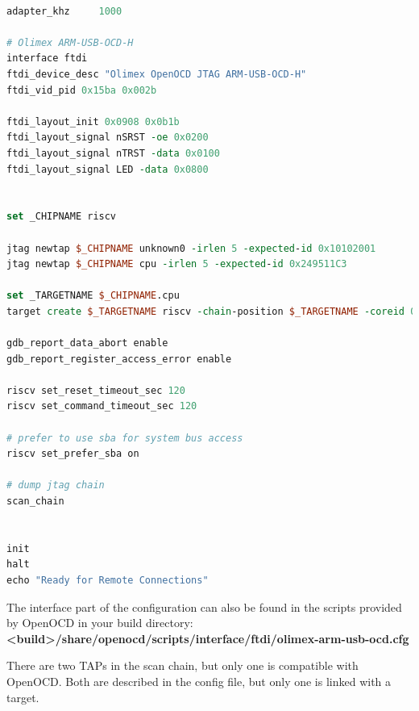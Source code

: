 \documentclass{article}
\begin{document}
    \begin{lstlisting}[language=tcl]

adapter_khz     1000

# Olimex ARM-USB-OCD-H
interface ftdi
ftdi_device_desc "Olimex OpenOCD JTAG ARM-USB-OCD-H"
ftdi_vid_pid 0x15ba 0x002b

ftdi_layout_init 0x0908 0x0b1b
ftdi_layout_signal nSRST -oe 0x0200
ftdi_layout_signal nTRST -data 0x0100
ftdi_layout_signal LED -data 0x0800


set _CHIPNAME riscv

jtag newtap $_CHIPNAME unknown0 -irlen 5 -expected-id 0x10102001
jtag newtap $_CHIPNAME cpu -irlen 5 -expected-id 0x249511C3

set _TARGETNAME $_CHIPNAME.cpu
target create $_TARGETNAME riscv -chain-position $_TARGETNAME -coreid 0x3e0

gdb_report_data_abort enable
gdb_report_register_access_error enable

riscv set_reset_timeout_sec 120
riscv set_command_timeout_sec 120

# prefer to use sba for system bus access
riscv set_prefer_sba on

# dump jtag chain
scan_chain


init
halt
echo "Ready for Remote Connections"
    \end{lstlisting}
    
    The interface part of the configuration can also be found in the scripts provided by OpenOCD in your build directory: \textbf{<build>/share/openocd/scripts/interface/ftdi/olimex-arm-usb-ocd.cfg}
    
    There are two TAPs in the scan chain, but only one is compatible with OpenOCD. Both are described in the config file, but only one is linked with a target.
    
	
\end{document}
